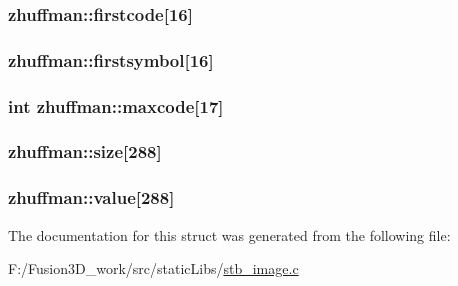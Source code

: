 \subsubsection[{firstcode}]{ zhuffman\+::firstcode\mbox{[}16\mbox{]}}\label{structzhuffman_a81f5ae5bd31b40439955de6154572917}
\hypertarget{structzhuffman_afbdb21fd99f413fc8f9e58243552fe95}{}
\subsubsection[{firstsymbol}]{ zhuffman\+::firstsymbol\mbox{[}16\mbox{]}}\label{structzhuffman_afbdb21fd99f413fc8f9e58243552fe95}
\hypertarget{structzhuffman_ac7dd4a2bf01a6e27933dd1cf6b0cc762}{}
\subsubsection[{maxcode}]{\setlength{\rightskip}{0pt plus 5cm}int zhuffman\+::maxcode\mbox{[}17\mbox{]}}\label{structzhuffman_ac7dd4a2bf01a6e27933dd1cf6b0cc762}
\hypertarget{structzhuffman_a46ce4d4a4d7fc41c2560616f6696e9b9}{}
\subsubsection[{size}]{ zhuffman\+::size\mbox{[}288\mbox{]}}\label{structzhuffman_a46ce4d4a4d7fc41c2560616f6696e9b9}
\hypertarget{structzhuffman_acc395b638b700b944c329d71a8b82084}{}
\subsubsection[{value}]{ zhuffman\+::value\mbox{[}288\mbox{]}}\label{structzhuffman_acc395b638b700b944c329d71a8b82084}


The documentation for this struct was generated from the following file\+:\begin{DoxyCompactItemize}
\item 
F\+:/\+Fusion3\+D\+\_\+work/src/static\+Libs/\hyperlink{stb__image_8c}{stb\+\_\+image.\+c}\end{DoxyCompactItemize}
